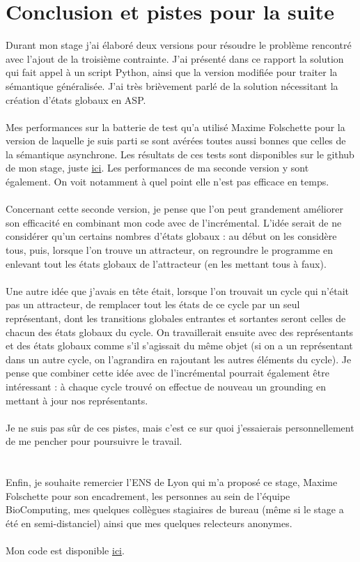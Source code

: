 \documentclass[12pt,a4paper]{article}
\begin{document}
\newpage
\section{Conclusion et pistes pour la suite}
Durant mon stage j'ai élaboré deux versions pour résoudre le problème rencontré avec l'ajout de la troisième contrainte. J'ai présenté dans ce rapport la solution qui fait appel à un script Python, ainsi que la version modifiée 
pour traiter la sémantique généralisée. J'ai très brièvement parlé de la solution nécessitant la création d'états globaux en ASP.\\ \\
Mes performances sur la batterie de test qu'a utilisé Maxime Folschette pour la version de laquelle je suis parti se sont avérées toutes aussi bonnes que celles de la sémantique asynchrone. Les résultats de ces tests sont 
disponibles sur le github de mon stage, juste \href{https://github.com/Leopoulpinator/Attractors-in-AAN/tree/main/versions/final_versions}{ici}. Les performances de ma seconde version y sont également. On voit notamment à quel point 
elle n'est pas efficace en temps.\\ \\
Concernant cette seconde version, je pense que l'on peut grandement améliorer son efficacité en combinant mon code avec de l'incrémental. L'idée serait de ne considérer qu'un certains nombres d'états globaux : au début on les 
considère tous, puis, lorsque l'on trouve un attracteur, on regroundre le programme en enlevant tout les états globaux de l'attracteur (en les mettant tous à faux).\\ \\
Une autre idée que j'avais en tête était, lorsque l'on trouvait un cycle qui n'était pas un attracteur, de remplacer tout les états de ce cycle par un seul représentant, dont les transitions globales entrantes et sortantes 
seront celles de chacun des états globaux du cycle. On travaillerait ensuite avec des représentants et des états globaux comme s'il s'agissait du même objet (si on a un représentant dans un autre cycle, on l'agrandira en rajoutant 
les autres éléments du cycle). Je pense que combiner cette idée avec de l'incrémental pourrait également être intéressant : à chaque cycle trouvé on effectue de nouveau un grounding en mettant à jour nos représentants.\\ \\
Je ne suis pas sûr de ces pistes, mais c'est ce sur quoi j'essaierais personnellement de me pencher pour poursuivre le travail.\\ \\ \\
Enfin, je souhaite remercier l'ENS de Lyon qui m'a proposé ce stage, Maxime Folschette pour son encadrement, les personnes au sein de l'équipe BioComputing, mes quelques collègues stagiaires de bureau (même si le stage a été en 
semi-distanciel) ainsi que mes quelques relecteurs anonymes.\\ \\
Mon code est disponible \href{https://github.com/Leopoulpinator/Attractors-in-AAN}{ici}.

\newpage

\end{document}
